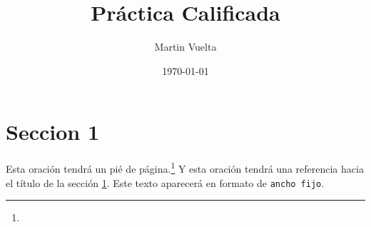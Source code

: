 \documentclass[a4paper, 12pt, final]{examen}
\begin{document}
    \title{Práctica Calificada}
    \author{Martin Vuelta}
    \date{\today}
    \maketitle
    
    \section{Seccion 1}\label{sec:1}
        \lipsum[1-4]
        
        Esta oración tendrá un pié de página.\footnote{\lipsum[2]} Y esta oración tendrá una referencia hacia el título de la sección  \ref{sec:1}. Este texto aparecerá en formato de \texttt{ancho fijo}.
\end{document}
